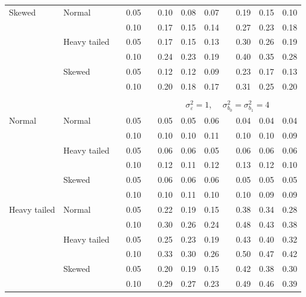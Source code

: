 \documentclass[12pt]{article} %
\begin{document}
\begin{table}[ht]
\begin{scriptsize}
\begin{center}
\begin{tabular}{ll p{.1cm} c p{.1cm} rrr p{.1cm} rrr}
Skewed       & Normal       && 0.05 &&  0.10 & 0.08 & 0.07 && 0.19 & 0.15 & 0.10 \\ 
             &              && 0.10 &&  0.17 & 0.15 & 0.14 && 0.27 & 0.23 & 0.18 \\ 
             & Heavy tailed && 0.05 &&  0.17 & 0.15 & 0.13 && 0.30 & 0.26 & 0.19 \\ 
             &              && 0.10 &&  0.24 & 0.23 & 0.19 && 0.40 & 0.35 & 0.28 \\ 
             & Skewed       && 0.05 &&  0.12 & 0.12 & 0.09 && 0.23 & 0.17 & 0.13 \\ 
             &              && 0.10 &&  0.20 & 0.18 & 0.17 && 0.31 & 0.25 & 0.20 \\ 


&&&&&&&&&&&\\
& && && \multicolumn{7}{c}{$\sigma_{\varepsilon}^2 = 1$, \ \ $\sigma_{b_0}^2 = \sigma_{b_1}^2 = 4$} \\ \cline{6-12}
\rowcolor{gray!20}Normal       & Normal       && 0.05 &&  0.05 & 0.05 & 0.06 && 0.04 & 0.04 & 0.04 \\ 
\rowcolor{gray!20}             &              && 0.10 &&  0.10 & 0.10 & 0.11 && 0.10 & 0.10 & 0.09 \\ 
\rowcolor{gray!20}             & Heavy tailed && 0.05 &&  0.06 & 0.06 & 0.05 && 0.06 & 0.06 & 0.06 \\ 
\rowcolor{gray!20}             &              && 0.10 &&  0.12 & 0.11 & 0.12 && 0.13 & 0.12 & 0.10 \\ 
\rowcolor{gray!20}             & Skewed       && 0.05 &&  0.06 & 0.06 & 0.06 && 0.05 & 0.05 & 0.05 \\ 
\rowcolor{gray!20}             &              && 0.10 &&  0.10 & 0.11 & 0.10 && 0.10 & 0.09 & 0.09 \\ 
Heavy tailed & Normal       && 0.05 &&  0.22 & 0.19 & 0.15 && 0.38 & 0.34 & 0.28 \\ 
             &              && 0.10 &&  0.30 & 0.26 & 0.24 && 0.48 & 0.43 & 0.38 \\ 
             & Heavy tailed && 0.05 &&  0.25 & 0.23 & 0.19 && 0.43 & 0.40 & 0.32 \\ 
             &              && 0.10 &&  0.33 & 0.30 & 0.26 && 0.50 & 0.47 & 0.42 \\ 
             & Skewed       && 0.05 &&  0.20 & 0.19 & 0.15 && 0.42 & 0.38 & 0.30 \\ 
             &              && 0.10 &&  0.29 & 0.27 & 0.23 && 0.49 & 0.46 & 0.39 \\ 

\end{tabular}
\end{center}
\end{scriptsize}
\end{table}
\end{document}
